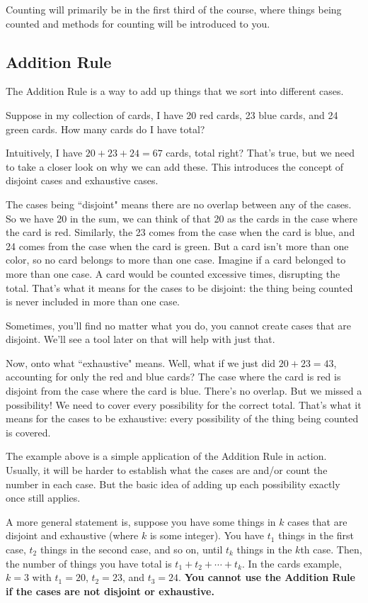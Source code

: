 \documentclass[11pt]{scrartcl}
\begin{document}
Counting will primarily be in the first third of the course, where things being counted and methods for counting will be introduced to you.

\subsection{Addition Rule}
The Addition Rule is a way to add up things that we sort into different cases.
\begin{example}
Suppose in my collection of cards, I have 20 red cards, 23 blue cards, and 24 green cards. How many cards do I have total?
\end{example}
Intuitively, I have $20 + 23 + 24 = 67$ cards, total right? That's true, but we need to take a closer look on why we can add these. This introduces the concept of disjoint cases and exhaustive cases.

The cases being ``disjoint" means there are no overlap between any of the cases. So we have 20 in the sum, we can think of that 20 as the cards in the case where the card is red. Similarly, the 23 comes from the case when the card is blue, and 24 comes from the case when the card is green. But a card isn't more than one color, so no card belongs to more than one case. Imagine if a card belonged to more than one case. A card would be counted excessive times, disrupting the total. That's what it means for the cases to be disjoint: the thing being counted is never included in more than one case.

Sometimes, you'll find no matter what you do, you cannot create cases that are disjoint. We'll see a tool later on that will help with just that.

Now, onto what ``exhaustive" means. Well, what if we just did $20 + 23 = 43$, accounting for only the red and blue cards? The case where the card is red is disjoint from the case where the card is blue. There's no overlap. But we missed a possibility! We need to cover every possibility for the correct total. That's what it means for the cases to be exhaustive: every possibility of the thing being counted is covered.

The example above is a simple application of the Addition Rule in action. Usually, it will be harder to establish what the cases are and/or count the number in each case. But the basic idea of adding up each possibility exactly once still applies.

A more general statement is, suppose you have some things in $k$ cases that are disjoint and exhaustive (where $k$ is some integer). You have $t_1$ things in the first case, $t_2$ things in the second case, and so on, until $t_k$ things in the $k$th case. Then, the number of things you have total is $t_1 + t_2 + \cdots + t_k$. In the cards example, $k = 3$ with $t_1 = 20$, $t_2 = 23$, and $t_3 = 24$. \textbf{You cannot use the Addition Rule if the cases are not disjoint or exhaustive.}
\end{document}
